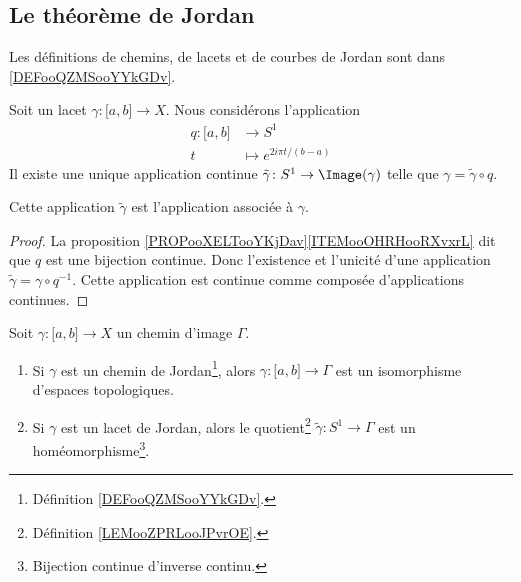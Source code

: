 


\subsection{Le théorème de Jordan}

Les définitions de chemins, de lacets et de courbes de Jordan sont dans \ref{DEFooQZMSooYYkGDv}.

\begin{lemmaDef}     \label{LEMooZPRLooJPvrOE}
	Soit un lacet \( \gamma\colon \mathopen[ a , b \mathclose]\to X\). Nous considérons l'application
	\begin{equation}
		\begin{aligned}
			q\colon \mathopen[ a , b \mathclose] & \to S^1                    \\
			t                                    & \mapsto  e^{2i\pi t/(b-a)}
		\end{aligned}
	\end{equation}
	Il existe une unique application continue \( \tilde \gamma\colon S^1\to \Image(\gamma)\) telle que \( \gamma=\tilde \gamma\circ q\).

	Cette application \( \tilde \gamma\) est l'application  associée à \( \gamma\).
\end{lemmaDef}

\begin{proof}
	La proposition \ref{PROPooXELTooYKjDav}\ref{ITEMooOHRHooRXvxrL} dit que \( q\) est une bijection continue. Donc l'existence et l'unicité d'une application \( \tilde \gamma=\gamma\circ q^{-1}\). Cette application est continue comme composée d'applications continues.
\end{proof}

\begin{lemma}     \label{LEMooCGVOooVPlSRD}
	Soit \( \gamma\colon \mathopen[ a , b \mathclose]\to X\) un chemin d'image \( \Gamma\).
	\begin{enumerate}
		\item       \label{ITEMooWKVAooCQDvpL}
		      Si \( \gamma\) est un chemin de Jordan\footnote{Définition \ref{DEFooQZMSooYYkGDv}.}, alors \( \gamma\colon \mathopen[ a , b \mathclose]\to \Gamma\) est un isomorphisme d'espaces topologiques.
		\item       \label{ITEMooVYMXooEtgPJT}
		      Si \( \gamma\) est un lacet de Jordan, alors le quotient\footnote{Définition \ref{LEMooZPRLooJPvrOE}.} \( \tilde \gamma\colon S^1\to \Gamma\) est un homéomorphisme\footnote{Bijection continue d'inverse continu.}.
	\end{enumerate}
\end{lemma}

